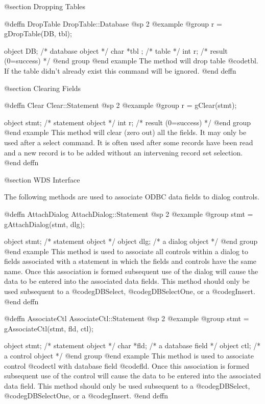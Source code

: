 @section Dropping Tables



@deffn {DropTable}  DropTable::Database
@sp 2
@example
@group
r = gDropTable(DB, tbl);

object  DB;     /*  database object    */
char    *tbl ;  /*  table              */
int     r;      /*  result (0=success) */
@end group
@end example
The method will drop table @code{tbl}.  If the table didn't already
exist this command will be ignored.
@end deffn



@section Clearing Fields


@deffn {Clear}  Clear::Statement
@sp 2
@example
@group
r = gClear(stmt);

object  stmt;   /*  statement object   */
int     r;      /*  result (0=success) */
@end group
@end example
This method will clear (zero out) all the fields.  It may only be used
after a select command.  It is often used after some records have been
read and a new record is to be added without an intervening record set
selection.
@end deffn


@section WDS Interface

The following methods are used to associate ODBC data fields to dialog controls.


@deffn {AttachDialog}  AttachDialog::Statement
@sp 2
@example
@group
stmt = gAttachDialog(stmt, dlg);

object  stmt;   /*  statement object   */
object  dlg;    /*  a dialog object    */
@end group
@end example
This method is used to associate all controls within a dialog to fields
associated with a statement in which the fields and controls have the
same name.  Once this association is formed subsequent use of the dialog
will cause the data to be entered into the associated data fields.
This method should only be used subsequent to a @code{gDBSelect}, @code{gDBSelectOne}, or
a @code{gInsert}.
@end deffn


@deffn {AssociateCtl}  AssociateCtl::Statement
@sp 2
@example
@group
stmt = gAssociateCtl(stmt, fld, ctl);

object  stmt;   /*  statement object   */
char    *fld;   /*  a database field   */
object  ctl;    /*  a control object   */
@end group
@end example
This method is used to associate control @code{ctl} with database field @code{fld}.
Once this association is formed subsequent use of the control
will cause the data to be entered into the associated data field.
This method should only be used subsequent to a @code{gDBSelect}, @code{gDBSelectOne}, or
a @code{gInsert}.
@end deffn
